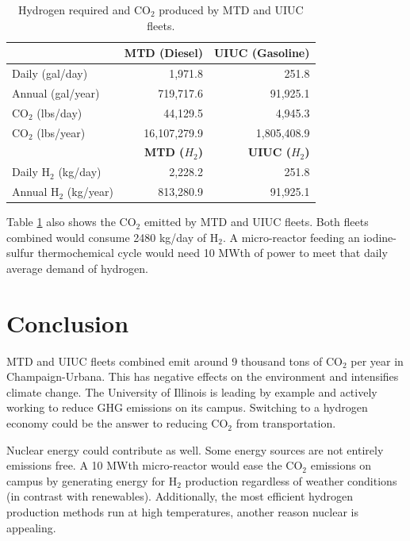 \documentclass{anstrans}
\begin{document}
\begin{table}[H]
	\centering
    \caption{Hydrogen required and CO$_2$ produced by MTD and UIUC fleets.}
    \label{tab:h2req}
\begin{tabular}{l|rr}
\hline
                   & \textbf{MTD (Diesel)}   & \textbf{UIUC (Gasoline)}  \\ \hline
                   Daily (gal/day)    & 1,971.8        & 251.8            \\
                   Annual (gal/year)    & 719,717.6      & 91,925.1         \\ 
                CO$_2$ (lbs/day)   & 44,129.5       & 4,945.3          \\
                CO$_2$ (lbs/year)  & 16,107,279.9   & 1,805,408.9      \\ \hline
                   & \textbf{MTD ($H_2$)}   & \textbf{UIUC ($H_2$)}  \\ \hline
                Daily H$_2$ (kg/day)    & 2,228.2        & 251.8            \\
                Annual H$_2$ (kg/year)   & 813,280.9      & 91,925.1         \\\hline
\end{tabular}
\end{table}

Table \ref{tab:h2req} also shows the CO$_2$ emitted by MTD and UIUC fleets.
Both fleets combined would consume 2480 kg/day of H$_2$. A micro-reactor feeding an iodine-sulfur thermochemical cycle would need 10 MWth of power to meet that daily average demand of hydrogen.

\section{Conclusion}

MTD and UIUC fleets combined emit around 9 thousand tons of CO$_2$ per year in Champaign-Urbana. This has negative effects on the environment and intensifies climate change. The University of Illinois is leading by example and actively working to reduce GHG emissions on its campus. Switching to a hydrogen economy could be the answer to reducing CO$_2$ from transportation.

Nuclear energy could contribute as well. Some energy sources are not entirely emissions free. A 10 MWth micro-reactor would ease the CO$_2$ emissions on campus by generating energy for H$_2$ production regardless of weather conditions (in contrast with renewables). Additionally, the most efficient hydrogen production methods run at high temperatures, another reason nuclear is appealing.
\end{document}
